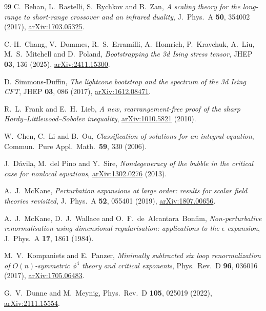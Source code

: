 \documentclass[11pt,a4paper]{article}
\numberwithin{equation}{section}
\begin{document}
\begin{thebibliography}{99}
C.~Behan, L.~Rastelli, S.~Rychkov and B.~Zan,
\emph{A scaling theory for the long-range to short-range crossover and an infrared duality},
J.\ Phys.\ A \textbf{50}, 354002 (2017),
\href{https://arxiv.org/abs/1703.05325}{arXiv:1703.05325}.

C.-H.~Chang, V.~Dommes, R.~S.~Erramilli, A.~Homrich, P.~Kravchuk, A.~Liu, M.~S.~Mitchell and
D.~Poland, \emph{Bootstrapping the 3d Ising stress tensor},
JHEP \textbf{03}, 136 (2025),
\href{https://arxiv.org/abs/2411.15300}{arXiv:2411.15300}.

D.~Simmons-Duffin,
\emph{The lightcone bootstrap and the spectrum of the 3d Ising CFT},
JHEP \textbf{03}, 086 (2017),
\href{https://arxiv.org/abs/1612.08471}{arXiv:1612.08471}.

R.~L.~Frank and E.~H.~Lieb,
\emph{A new, rearrangement-free proof of the sharp Hardy--Littlewood--Sobolev inequality},
\href{https://arxiv.org/abs/1010.5821}{arXiv:1010.5821} (2010).

W.~Chen, C.~Li and B.~Ou,
\emph{Classification of solutions for an integral equation},
Commun.\ Pure Appl.\ Math.\ \textbf{59}, 330 (2006).

J.~D\'avila, M.~del Pino and Y.~Sire,
\emph{Nondegeneracy of the bubble in the critical case for nonlocal equations},
\href{https://arxiv.org/abs/1302.0276}{arXiv:1302.0276} (2013).

A.~J.~McKane,
\emph{Perturbation expansions at large order: results for scalar field theories revisited},
J.\ Phys.\ A \textbf{52}, 055401 (2019),
\href{https://arxiv.org/abs/1807.00656}{arXiv:1807.00656}.

A.~J.~McKane, D.~J.~Wallace and O.~F.~de~Alcantara~Bonfim,
\emph{Non-perturbative renormalisation using dimensional regularisation: applications to the
$\epsilon$ expansion}, J.\ Phys.\ A \textbf{17}, 1861 (1984).

M.~V.~Kompaniets and E.~Panzer,
\emph{Minimally subtracted six loop renormalization of $O(n)$-symmetric $\phi^4$ theory and
critical exponents}, Phys.\ Rev.\ D \textbf{96}, 036016 (2017),
\href{https://arxiv.org/abs/1705.06483}{arXiv:1705.06483}.

G.~V.~Dunne and M.~Meynig,
Phys.\ Rev.\ D \textbf{105}, 025019 (2022),
\href{https://arxiv.org/abs/2111.15554}{arXiv:2111.15554}.


\end{thebibliography}
\end{document}
